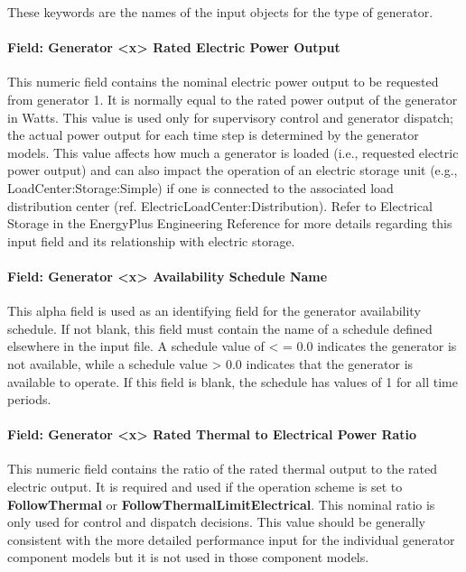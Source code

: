 These keywords are the names of the input objects for the type of generator.

\paragraph{Field: Generator \textless{}x\textgreater{} Rated Electric Power Output}\label{field-generator-x-rated-electric-power-output}

This numeric field contains the nominal electric power output to be requested from generator 1. It is normally equal to the rated power output of the generator in Watts. This value is used only for supervisory control and generator dispatch; the actual power output for each time step is determined by the generator models. This value affects how much a generator is loaded (i.e., requested electric power output) and can also impact the operation of an electric storage unit (e.g., LoadCenter:Storage:Simple) if one is connected to the associated load distribution center (ref. ElectricLoadCenter:Distribution). Refer to Electrical Storage in the EnergyPlus Engineering Reference for more details regarding this input field and its relationship with electric storage.

\paragraph{Field: Generator \textless{}x\textgreater{} Availability Schedule Name}\label{field-generator-x-availability-schedule-name}

This alpha field is used as an identifying field for the generator availability schedule. If not blank, this field must contain the name of a schedule defined elsewhere in the input file. A schedule value of \textless{} = 0.0 indicates the generator is not available, while a schedule value \textgreater{} 0.0 indicates that the generator is available to operate. If this field is blank, the schedule has values of 1 for all time periods.

\paragraph{Field: Generator \textless{}x\textgreater{} Rated Thermal to Electrical Power Ratio}\label{field-generator-x-rated-thermal-to-electrical-power-ratio}

This numeric field contains the ratio of the rated thermal output to the rated electric output. It is required and used if the operation scheme is set to \textbf{FollowThermal} or \textbf{FollowThermalLimitElectrical}. This nominal ratio is only used for control and dispatch decisions. This value should be generally consistent with the more detailed performance input for the individual generator component models but it is not used in those component models.


